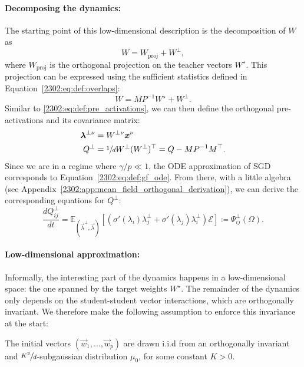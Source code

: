 \paragraph{Decomposing the dynamics:} The starting point of this low-dimensional description is the decomposition of $W$ as
\begin{equation}\label{2302:eq:W_proj}
    W = W_{\text{proj}} + W^\bot,
\end{equation}
where $W_{\text{proj}}$ is the orthogonal projection on the teacher vectors $W^\star$. This projection can be expressed using the sufficient statistics defined in Equation~\eqref{2302:eq:def:overlaps}:
\begin{equation}\label{2302:eq:W_proj_simplified}
    W =  M P^{-1} W^\star + W^\bot.
\end{equation}
Similar to \eqref{2302:eq:def:pre_activations}, we can then define the orthogonal pre-activations and its covariance matrix:
\begin{align}\label{2302:eq:def:lambda_orth}
    {\boldsymbol{\lambda}}^{\bot\nu} &= W^{\bot\nu}{\boldsymbol{x}}^\nu \\
    \label{2302:eq:def:Qorth}
    Q^\bot &= \sfrac{1}{d} W^\bot (W^\bot)^\top = Q - MP^{-1}M^\top  .
\end{align}
Since we are in a regime where $\gamma / p \ll 1$, the ODE approximation of SGD corresponds to Equation~\eqref{2302:eq:def:gf_ode}. From there, with a little algebra (see Appendix~\ref{2302:app:mean_field_orthogonal_derivation}), we can derive the corresponding equations for $Q^\bot$:
\begin{equation} \label{2302:eq:def:mf_orthogonal}
    \frac{dQ_{ij}^\bot}{dt} =  \mathbb E_{(\vec{\lambda}^{\bot},\vec{\lambda})}\left[\left( \sigma'(\lambda_i)\lambda_j^\bot + \sigma'(\lambda_j)\lambda_i^\bot \right) \mathcal{E} \right] \coloneqq \Psi^\bot_{ij}(\Omega).
\end{equation}

\paragraph{Low-dimensional approximation:} Informally, the interesting part of the dynamics happens in a low-dimensional space: the one spanned by the target weights $W^\star$. The remainder of the dynamics only depends on the student-student vector interactions, which are orthogonally invariant. We therefore make the following assumption to enforce this invariance at the start:
\begin{assump}\label{2302:assump:init}
    The initial vectors $(\vec{w}_1, \dots, \vec{w}_p)$ are drawn i.i.d from an orthogonally invariant and $\sfrac{K^2}{d}$-subgaussian distribution $\mu_0$, for some constant $K > 0$.
\end{assump}

